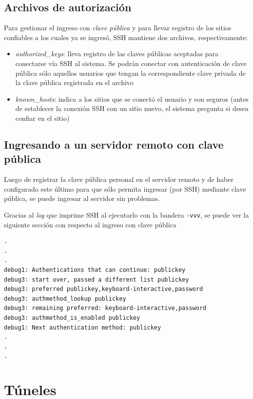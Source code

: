 \subsection{Archivos de autorización}

Para gestionar el ingreso con \emph{clave pública} y para llevar registro de los sitios confiables a los cuales ya se ingresó, SSH mantiene dos archivos, respectivamente:

\begin{itemize}
    \item \emph{authorized\_keys}: lleva registro de las claves públicas aceptadas para conectarse vía SSH al sistema. Se podrán conectar con autenticación de clave pública sólo aquellos usuarios que tengan la correspondiente clave privada de la clave pública registrada en el archivo 
    \item \emph{known\_hosts}: indica a los sitios que se conectó el usuario y son seguros (antes de establecer la conexión SSH con un sitio nuevo, el sistema pregunta si desea confiar en el sitio) 
\end{itemize}

\subsection{Ingresando a un servidor remoto con clave pública}

Luego de registrar la clave pública personal en el servidor remoto y de haber configurado este último para que sólo permita ingresar (por SSH) mediante clave pública, se puede ingresar al servidor sin problemas.

Gracias al \emph{log} que imprime SSH al ejecutarlo con la bandera \texttt{-vvv}, se puede ver la siguiente sección con respecto al ingreso con clave pública

\begin{lstlisting}
.
.
.
debug1: Authentications that can continue: publickey
debug3: start over, passed a different list publickey
debug3: preferred publickey,keyboard-interactive,password
debug3: authmethod_lookup publickey
debug3: remaining preferred: keyboard-interactive,password
debug3: authmethod_is_enabled publickey
debug1: Next authentication method: publickey
.
.
.
\end{lstlisting}

\section{Túneles}










\clearpage
\printbibliography


